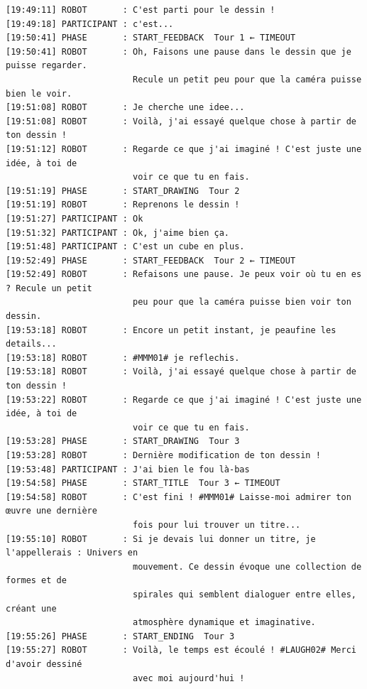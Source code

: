 \documentclass[11pt]{article}
\begin{document}
{\begin{verbatim}
[19:49:11] ROBOT       : C'est parti pour le dessin !
[19:49:18] PARTICIPANT : c'est...
[19:50:41] PHASE       : START_FEEDBACK  Tour 1 ← TIMEOUT
[19:50:41] ROBOT       : Oh, Faisons une pause dans le dessin que je puisse regarder.
                         Recule un petit peu pour que la caméra puisse bien le voir.
[19:51:08] ROBOT       : Je cherche une idee...
[19:51:08] ROBOT       : Voilà, j'ai essayé quelque chose à partir de ton dessin !
[19:51:12] ROBOT       : Regarde ce que j'ai imaginé ! C'est juste une idée, à toi de
                         voir ce que tu en fais.
[19:51:19] PHASE       : START_DRAWING  Tour 2
[19:51:19] ROBOT       : Reprenons le dessin !
[19:51:27] PARTICIPANT : Ok
[19:51:32] PARTICIPANT : Ok, j'aime bien ça.
[19:51:48] PARTICIPANT : C'est un cube en plus.
[19:52:49] PHASE       : START_FEEDBACK  Tour 2 ← TIMEOUT
[19:52:49] ROBOT       : Refaisons une pause. Je peux voir où tu en es ? Recule un petit
                         peu pour que la caméra puisse bien voir ton dessin.
[19:53:18] ROBOT       : Encore un petit instant, je peaufine les details...
[19:53:18] ROBOT       : #MMM01# je reflechis.
[19:53:18] ROBOT       : Voilà, j'ai essayé quelque chose à partir de ton dessin !
[19:53:22] ROBOT       : Regarde ce que j'ai imaginé ! C'est juste une idée, à toi de
                         voir ce que tu en fais.
[19:53:28] PHASE       : START_DRAWING  Tour 3
[19:53:28] ROBOT       : Dernière modification de ton dessin !
[19:53:48] PARTICIPANT : J'ai bien le fou là-bas
[19:54:58] PHASE       : START_TITLE  Tour 3 ← TIMEOUT
[19:54:58] ROBOT       : C'est fini ! #MMM01# Laisse-moi admirer ton œuvre une dernière
                         fois pour lui trouver un titre...
[19:55:10] ROBOT       : Si je devais lui donner un titre, je l'appellerais : Univers en
                         mouvement. Ce dessin évoque une collection de formes et de
                         spirales qui semblent dialoguer entre elles, créant une
                         atmosphère dynamique et imaginative.
[19:55:26] PHASE       : START_ENDING  Tour 3
[19:55:27] ROBOT       : Voilà, le temps est écoulé ! #LAUGH02# Merci d'avoir dessiné
                         avec moi aujourd'hui !
\end{verbatim}
}
\end{document}
